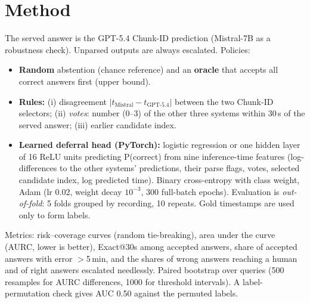 \documentclass[10pt,a4paper]{article}
\begin{document}
\section{Method}
The served answer is the GPT-5.4 Chunk-ID prediction (Mistral-7B as a robustness check). Unparsed outputs are always escalated. Policies:
\begin{itemize}
\item \textbf{Random} abstention (chance reference) and an \textbf{oracle} that accepts all correct answers first (upper bound).
\item \textbf{Rules:} (i) disagreement $|t_{\text{Mistral}}-t_{\text{GPT-5.4}}|$ between the two Chunk-ID selectors; (ii) \emph{votes}: number (0--3) of the other three systems within 30\,s of the served answer; (iii) earlier candidate index.
\item \textbf{Learned deferral head (PyTorch):} logistic regression or one hidden layer of 16 ReLU units predicting P(correct) from nine inference-time features (log-differences to the other systems' predictions, their parse flags, votes, selected candidate index, log predicted time). Binary cross-entropy with class weight, Adam (lr 0.02, weight decay $10^{-3}$, 300 full-batch epochs). Evaluation is \emph{out-of-fold}: 5 folds grouped by recording, 10 repeats. Gold timestamps are used only to form labels.
\end{itemize}
Metrics: risk--coverage curves (random tie-breaking), area under the curve (AURC, lower is better), Exact@30s among accepted answers, share of accepted answers with error $>$5\,min, and the shares of wrong answers reaching a human and of right answers escalated needlessly. Paired bootstrap over queries (500 resamples for AURC differences, 1000 for threshold intervals). A label-permutation check gives AUC 0.50 against the permuted labels.
\end{document}
